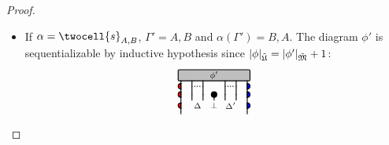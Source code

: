 \documentclass[a4paper]{article}
\begin{document}
\begin{theorem}
\begin{proof}
\begin{itemize}
\begin{itemize}
\item If $\alpha= \twocell{s}_{A, B} $, $\Gamma' = A,B$ and $\alpha(\Gamma')= B,A$. The diagram $\phi'$ is sequentializable by inductive hypothesis since $|\phi|_{{\tilde{\mathfrak{U}}}}= |\phi' |_{\tilde{\mathfrak{M}}} +1$:
$$
{\raisebox{-12.50pt}{\begin{tikzpicture} \begin{scope} [ x = 10pt, y = 10pt, join = round, cap = round, thick, black, solid, -]
\draw [rounded corners = 1pt, fill = lightgray] (-.25,2.50) rectangle (6.25, 3.5) ; \node at (3,3) {$\scriptstyle \phi'$};
 \draw (0.00,2.50)--(0.00,2.25) (1.00,2.50)--(1.00,2.00) (2.00,2.50)--(2.00,2.00) (4.00,2.50)--(4.00,2.00) (5.00,2.50)--(5.00,2.00) (6.00,2.50)--(6.00,2.25) ; \draw (0.00,0.00)--(0.00,-0.50) (6.00,0.00)--(6.00,-0.50) ; \draw (0.00,2.25)--(0.00,2.00) ; \draw (0.00,1.75)--(0.00,2.00) ; \draw [fill = red] (0.00,2.25) arc (90:270:0.25) ; \draw (0.00,1.75)--(0.00,2.25) ; \draw [dash pattern = on 0.25pt off 2pt] (1.25,2.00)--(1.75,2.00) ; \draw [dash pattern = on 0.25pt off 2pt] (4.25,2.00)--(4.75,2.00) ; \draw (6.00,2.25)--(6.00,2.00) ; \draw (6.00,1.75)--(6.00,2.00) ; \draw [fill = blue] (6.00,1.75) arc (-90:90:0.25) ; \draw (6.00,1.75)--(6.00,2.25) ; \draw (0.00,1.75)--(0.00,1.50) (1.00,2.00)--(1.00,1.25) (2.00,2.00)--(2.00,1.25) (4.00,2.00)--(4.00,1.25) (5.00,2.00)--(5.00,1.25) (6.00,1.75)--(6.00,1.50) ; \draw (0.00,1.50)--(0.00,1.25) ; \draw (0.00,1.00)--(0.00,1.25) ; \draw [fill = red] (0.00,1.50) arc (90:270:0.25) ; \draw (0.00,1.00)--(0.00,1.50) ;  \draw  ; \draw (3.00,1.00)--(3.00,1.25) ; \draw [fill = black] (3.00,1.25) circle (0.25) ;  \draw (6.00,1.50)--(6.00,1.25) ; \draw (6.00,1.00)--(6.00,1.25) ; \draw [fill = blue] (6.00,1.00) arc (-90:90:0.25) ; \draw (6.00,1.00)--(6.00,1.50) ; \draw (0.00,1.00)--(0.00,0.50) (1.00,1.25)--(1.00,0.75) (2.00,1.25)--(2.00,0.75) (3.00,1.00)--(3.00,0.75) (4.00,1.25)--(4.00,0.75) (5.00,1.25)--(5.00,0.75) (6.00,1.00)--(6.00,0.50) ; \draw (0.00,0.50)--(0.00,0.25) ; \draw (0.00,0.00)--(0.00,0.25) ; \draw [fill = red] (0.00,0.50) arc (90:270:0.25) ; \draw (0.00,0.00)--(0.00,0.50) ; \node at (1.50,0.25) {$\scriptstyle \Delta$} ; \node at (3.00,0.25) {$\scriptstyle \bot$} ; \node at (4.50,0.25) {$\scriptstyle \Delta'$} ; \draw (6.00,0.50)--(6.00,0.25) ; \draw (6.00,0.00)--(6.00,0.25) ; \draw [fill = blue] (6.00,0.00) arc (-90:90:0.25) ; \draw (6.00,0.00)--(6.00,0.50) ; \end{scope} \end{tikzpicture}}}$$
 

\end{itemize}
\end{itemize}
\end{proof}
\end{theorem}
\end{document}

